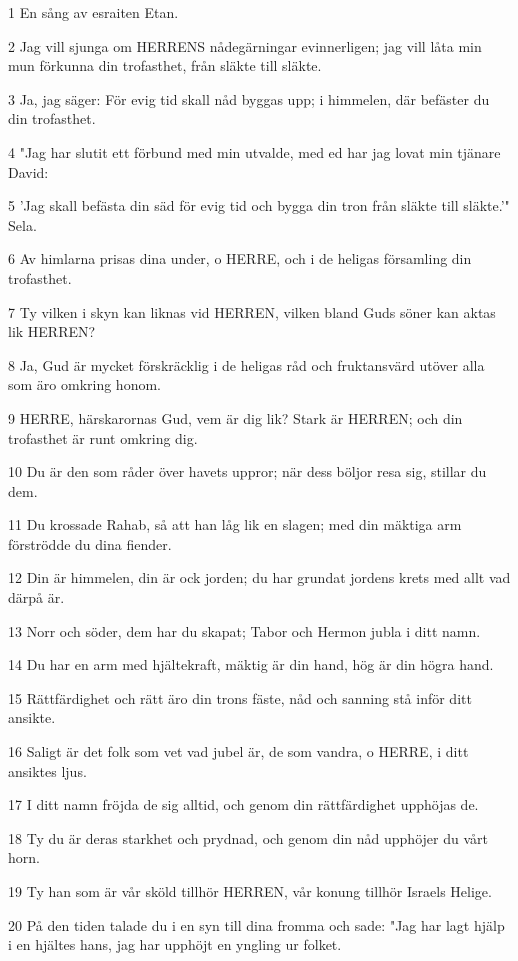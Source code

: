 \par 1 En sång av esraiten Etan.
\par 2 Jag vill sjunga om HERRENS nådegärningar evinnerligen; jag vill låta min mun förkunna din trofasthet, från släkte till släkte.
\par 3 Ja, jag säger: För evig tid skall nåd byggas upp; i himmelen, där befäster du din trofasthet.
\par 4 "Jag har slutit ett förbund med min utvalde, med ed har jag lovat min tjänare David:
\par 5 'Jag skall befästa din säd för evig tid och bygga din tron från släkte till släkte.'" Sela.
\par 6 Av himlarna prisas dina under, o HERRE, och i de heligas församling din trofasthet.
\par 7 Ty vilken i skyn kan liknas vid HERREN, vilken bland Guds söner kan aktas lik HERREN?
\par 8 Ja, Gud är mycket förskräcklig i de heligas råd och fruktansvärd utöver alla som äro omkring honom.
\par 9 HERRE, härskarornas Gud, vem är dig lik? Stark är HERREN; och din trofasthet är runt omkring dig.
\par 10 Du är den som råder över havets uppror; när dess böljor resa sig, stillar du dem.
\par 11 Du krossade Rahab, så att han låg lik en slagen; med din mäktiga arm förströdde du dina fiender.
\par 12 Din är himmelen, din är ock jorden; du har grundat jordens krets med allt vad därpå är.
\par 13 Norr och söder, dem har du skapat; Tabor och Hermon jubla i ditt namn.
\par 14 Du har en arm med hjältekraft, mäktig är din hand, hög är din högra hand.
\par 15 Rättfärdighet och rätt äro din trons fäste, nåd och sanning stå inför ditt ansikte.
\par 16 Saligt är det folk som vet vad jubel är, de som vandra, o HERRE, i ditt ansiktes ljus.
\par 17 I ditt namn fröjda de sig alltid, och genom din rättfärdighet upphöjas de.
\par 18 Ty du är deras starkhet och prydnad, och genom din nåd upphöjer du vårt horn.
\par 19 Ty han som är vår sköld tillhör HERREN, vår konung tillhör Israels Helige.
\par 20 På den tiden talade du i en syn till dina fromma och sade: "Jag har lagt hjälp i en hjältes hans, jag har upphöjt en yngling ur folket.
